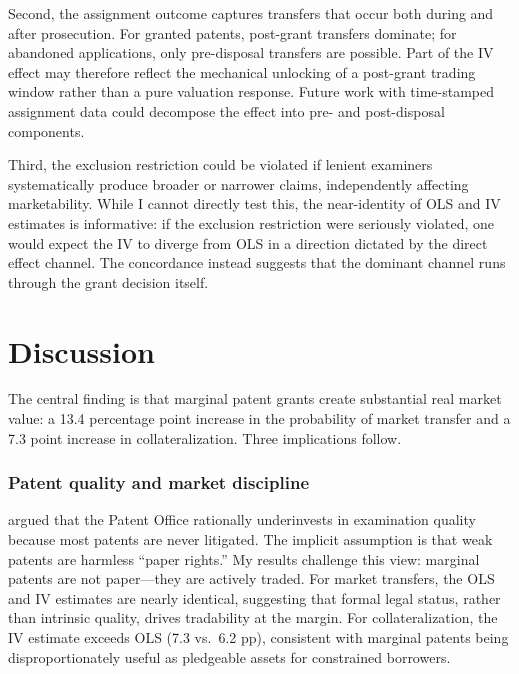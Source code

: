 \documentclass[12pt]{article}
\begin{document}
Second, the assignment outcome captures transfers that occur both during and after prosecution. For granted patents, post-grant transfers dominate; for abandoned applications, only pre-disposal transfers are possible. Part of the IV effect may therefore reflect the mechanical unlocking of a post-grant trading window rather than a pure valuation response. Future work with time-stamped assignment data could decompose the effect into pre- and post-disposal components.

Third, the exclusion restriction could be violated if lenient examiners systematically produce broader or narrower claims, independently affecting marketability. While I cannot directly test this, the near-identity of OLS and IV estimates is informative: if the exclusion restriction were seriously violated, one would expect the IV to diverge from OLS in a direction dictated by the direct effect channel. The concordance instead suggests that the dominant channel runs through the grant decision itself.


\section{Discussion}
\label{sec:discussion}

The central finding is that marginal patent grants create substantial real market value: a 13.4 percentage point increase in the probability of market transfer and a 7.3 point increase in collateralization. Three implications follow.

\subsubsection*{Patent quality and market discipline} \citet{lemley2001rational} argued that the Patent Office rationally underinvests in examination quality because most patents are never litigated. The implicit assumption is that weak patents are harmless ``paper rights.'' My results challenge this view: marginal patents are not paper---they are actively traded. For market transfers, the OLS and IV estimates are nearly identical, suggesting that formal legal status, rather than intrinsic quality, drives tradability at the margin. For collateralization, the IV estimate exceeds OLS (7.3 vs.~6.2 pp), consistent with marginal patents being disproportionately useful as pledgeable assets for constrained borrowers.
\end{document}
